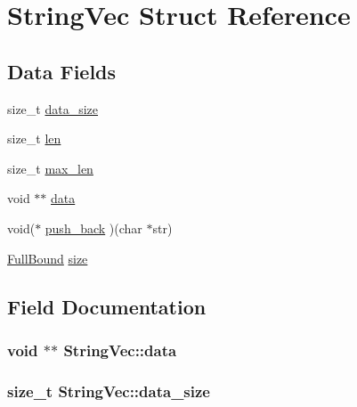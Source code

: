 \hypertarget{struct_string_vec}{}\section{String\+Vec Struct Reference}
\label{struct_string_vec}
\subsection*{Data Fields}
\begin{DoxyCompactItemize}
\item 
size\+\_\+t \hyperlink{struct_string_vec_a505092c0cc63a215ddc950726453196e}{data\+\_\+size}
\item 
size\+\_\+t \hyperlink{struct_string_vec_a1dc740add1d3783ed79b118f3b115e7e}{len}
\item 
size\+\_\+t \hyperlink{struct_string_vec_acd88f36d6487fb52ec7fac1e2a3699fc}{max\+\_\+len}
\item 
void $\ast$$\ast$ \hyperlink{struct_string_vec_a0ef48f702209e994978bb9bb6c13291c}{data}
\item 
void($\ast$ \hyperlink{struct_string_vec_af05c9a2ae87afdb54531240ca7ff125d}{push\+\_\+back} )(char $\ast$str)
\item 
\hyperlink{bind__defs_8h_a7c87cc0eb01b046c5adc0fb1d6fcd62c}{Full\+Bound} \hyperlink{struct_string_vec_ae4ae32f5a45935a1d362357d264b6c2c}{size}
\end{DoxyCompactItemize}


\subsection{Field Documentation}
\subsubsection[{\texorpdfstring{data}{data}}]{\setlength{\rightskip}{0pt plus 5cm}void $\ast$$\ast$ String\+Vec\+::data}\hypertarget{struct_string_vec_a0ef48f702209e994978bb9bb6c13291c}{}\label{struct_string_vec_a0ef48f702209e994978bb9bb6c13291c}
\subsubsection[{\texorpdfstring{data\+\_\+size}{data_size}}]{\setlength{\rightskip}{0pt plus 5cm}size\+\_\+t String\+Vec\+::data\+\_\+size}\hypertarget{struct_string_vec_a505092c0cc63a215ddc950726453196e}{}\label{struct_string_vec_a505092c0cc63a215ddc950726453196e}
